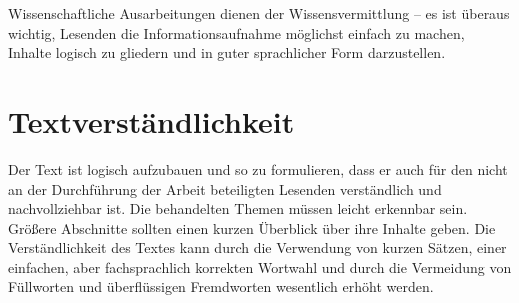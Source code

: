 
Wissenschaftliche Ausarbeitungen dienen der Wissensvermittlung -- es ist überaus wichtig, Lesenden die Informationsaufnahme möglichst einfach zu machen, Inhalte logisch zu gliedern und in guter sprachlicher Form darzustellen.


\section{Textverständlichkeit}

Der Text ist logisch aufzubauen und so zu formulieren, dass er auch für den nicht an der Durchführung der Arbeit beteiligten Lesenden verständlich und nachvollziehbar ist. Die behandelten Themen müssen leicht erkennbar sein. Größere Abschnitte sollten einen kurzen Überblick über ihre Inhalte geben. Die Verständlichkeit des Textes kann durch die Verwendung von kurzen Sätzen, einer einfachen, aber fachsprachlich korrekten Wortwahl und durch die Vermeidung von Füllworten und überflüssigen Fremdworten wesentlich erhöht werden.

